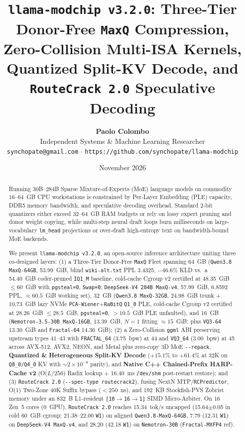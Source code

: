 \documentclass[10pt,twocolumn]{article}
\title{\textbf{\Large \texttt{llama-modchip v3.2.0}: Three-Tier Donor-Free \texttt{MaxQ} Compression, Zero-Collision Multi-ISA Kernels, Quantized Split-KV Decode, and \texttt{RouteCrack 2.0} Speculative Decoding}}
\author{
  \textbf{Paolo Colombo} \\
  Independent Systems \& Machine Learning Researcher \\
  \texttt{synchopate@gmail.com} \quad $\cdot$ \quad \texttt{https://github.com/synchopate/llama-modchip}
}
\date{November 2026}
\begin{document}
\maketitle

\begin{abstract}
Running 30B--284B Sparse Mixture-of-Experts (MoE) language models on commodity 16--64~GB CPU workstations is constrained by Per-Layer Embedding (PLE) capacity, DDR5 memory bandwidth, and speculative decoding overhead. Standard 2-bit quantizers either exceed 32--64~GB RAM budgets or rely on lossy expert pruning and donor weight copying, while multi-step neural draft loops burn milliseconds on large-vocabulary \texttt{lm\_head} projections or over-draft high-entropy text on bandwidth-bound MoE backends.

We present \texttt{llama-modchip v3.2.0}, an open-source inference architecture uniting three co-designed layers: (1) a Three-Tier Donor-Free \texttt{MaxQ} Fleet spanning 64~GB (\texttt{Qwen3.8 MaxQ-64GB}, 53.99~GiB, blind \texttt{wiki-alt.txt} PPL 3.4325, $-46.6\%$ KLD vs.\ a 54.40~GiB coder-pruned \texttt{IQ1\_M} baseline, cold-cache Cgroup v2 certified at 48.35~GiB $\le 60$~GiB with \texttt{pgsteal=0}, \texttt{Swap=0}; \texttt{DeepSeek-V4 284B MaxQ-v4}, 57.99~GiB, 6.8592 PPL, $\approx 60.5$~GiB working set), 32~GB (\texttt{Qwen3.8 MaxQ-32GB}, 24.98~GiB trunk + 10.73~GiB lazy NVMe \texttt{PCA-Wiener}+\texttt{RaBitQ} \mbox{\texttt{Q1\_0}} PLE, cold-cache Cgroup v2 certified at 28.26~GiB $\le 28.5$~GiB, \texttt{pgsteal=0}, $>10.5$~GiB PLE unfaulted), and 16~GB (\texttt{Nemotron-3.5-30B MaxQ-16GB}, 13.39~GiB, $N=1$ fitting ${\approx}15$~GiB; plus \texttt{VQ3-64} 13.30~GiB and \texttt{Fractal-64} 14.36~GiB); (2) a Zero-Collision \texttt{ggml} ABI preserving upstream types 41--43 with \texttt{FRACTAL\_64} (3.75~bpw) at 44 and \texttt{VQ3\_64} (3.00~bpw) at 45 across AVX-512, AVX2, NEON, and Metal plus zero-copy 3D MoE \texttt{{-}{-}repack}, \textbf{Quantized \& Heterogeneous Split-KV Decode} ($+15.1\%$ to $+61.4\%$ at 32K on \texttt{Q8\_0/Q4\_0} KV with ${\sim}2\times 10^{-8}$ parity), and \textbf{Native C++ Chained-Prefix HARP-Cache v2} (O($L/256$) Radix lookup + 16.40~ms \texttt{/dev/shm} post-restart restore); and (3) \texttt{RouteCrack 2.0} (\texttt{{-}{-}spec-type routecrack2}), fusing NextN MTP/\texttt{RCPredictor}, O(1) Two-Zone 40K Suffix bypass ($<250$~ns), and 192~KB Stockfish-PVS Zobrist memory under an 832~B L1-resident \texttt{[10$\to$16$\to$1]} SIMD Micro-Arbiter. On 16 Zen~5 cores (0~GPU), \texttt{RouteCrack 2.0} reaches 15.34~tok/s uncapped (15.64$\pm$0.05 in cold 60~GiB cgroup; 21.38--22.00 \texttt{W1}) on aligned \texttt{Qwen3.8-MaxQ-64GB}, 7.79 (12.31 \texttt{W1}) on \texttt{DeepSeek-V4 MaxQ-v4}, and 28.20 (42.18 \texttt{W1}) on \texttt{Nemotron-30B} (\texttt{Fractal-MXFP4} ref).
\end{abstract}
\end{document}
